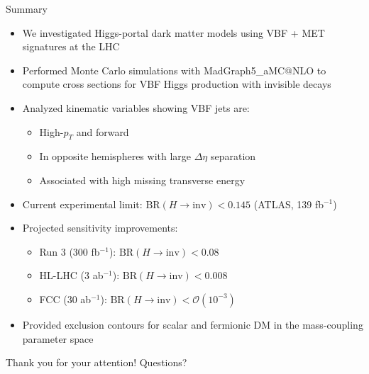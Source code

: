 \documentclass{../../bredelebeamer}
\begin{document}
\begin{frame}{Summary}
    \begin{itemize}
        \item We investigated Higgs-portal dark matter models using VBF + MET signatures at the LHC
        \item Performed Monte Carlo simulations with MadGraph5\_aMC@NLO to compute cross sections for VBF Higgs production with invisible decays
        \item Analyzed kinematic variables showing VBF jets are:
        \begin{itemize}
            \item High-$p_T$ and forward
            \item In opposite hemispheres with large $\Delta\eta$ separation
            \item Associated with high missing transverse energy
        \end{itemize}
        \item Current experimental limit: $\text{BR}(H \to \text{inv}) < 0.145$ (ATLAS, 139 fb$^{-1}$)
        \item Projected sensitivity improvements:
        \begin{itemize}
            \item Run 3 (300 fb$^{-1}$): $\text{BR}(H \to \text{inv}) < 0.08$
            \item HL-LHC (3 ab$^{-1}$): $\text{BR}(H \to \text{inv}) < 0.008$
            \item FCC (30 ab$^{-1}$): $\text{BR}(H \to \text{inv}) < \mathcal{O}(10^{-3})$
        \end{itemize}
        \item Provided exclusion contours for scalar and fermionic DM in the mass-coupling parameter space
    \end{itemize}
\end{frame}

\begin{frame}
    \centering
    \Huge Thank you for your attention!
    \vfill
    \Large Questions?
\end{frame}
\end{document}
